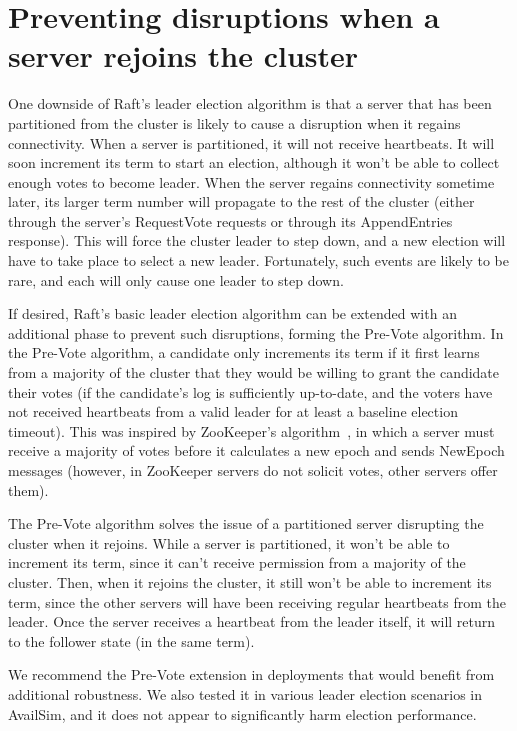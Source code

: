 \section{Preventing disruptions when a server rejoins the cluster}
\label{leaderelection:prevote}

One downside of Raft's leader election algorithm is that a server that
has been partitioned from the cluster is likely to cause a disruption
when it regains connectivity. When a server is partitioned, it will not
receive heartbeats. It will soon increment its term to start an
election, although it won't be able to collect enough votes to become
leader. When the server regains connectivity sometime later, its larger
term number will propagate to the rest of the cluster (either through
the server's RequestVote requests or through its AppendEntries
response). This will force the cluster leader to step down, and a new
election will have to take place to select a new leader. Fortunately,
such events are likely to be rare, and each will only cause one leader to
step down.

If desired, Raft's basic leader election algorithm can be extended with
an additional phase to prevent such disruptions, forming the Pre-Vote
algorithm. In the Pre-Vote algorithm, a candidate only increments its
term if it first learns from a majority of the cluster that they would
be willing to grant the candidate their votes (if the candidate's log is
sufficiently up-to-date, and the voters have not received heartbeats from
a valid leader for at least a baseline election timeout). This was
inspired by ZooKeeper's algorithm~\cite{Junqueira:2011}, in which a
server must receive a majority of votes before it calculates a new epoch
and sends NewEpoch messages (however, in ZooKeeper servers do not
solicit votes, other servers offer them).

The Pre-Vote algorithm solves the issue of a partitioned server
disrupting the cluster when it rejoins. While a server is partitioned,
it won't be able to increment its term, since it can't receive
permission from a majority of the cluster. Then, when it rejoins the
cluster, it still won't be able to increment its term, since the other
servers will have been receiving regular heartbeats from the leader.
Once the server receives a heartbeat from the leader itself, it will
return to the follower state (in the same term).

We recommend the Pre-Vote extension in deployments that would benefit
from additional robustness. We also tested it in various leader
election scenarios in AvailSim, and it does not appear to significantly
harm election performance.

